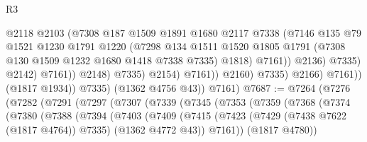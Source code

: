 \begin{lexlean}{R3}
\begin{coremodule}
                                          @2118
                                          @2103
                                          (@7308
                                            @187
                                            @1509
                                            @1891
                                            @1680
                                            @2117
                                            @7338
                                            (@7146
                                              @135
                                              @79
                                              @1521
                                              @1230
                                              @1791
                                              @1220
                                              (@7298
                                                @134
                                                @1511
                                                @1520
                                                @1805
                                                @1791
                                                (@7308 @130 @1509 @1232 @1680 @1418 @7338 @7335)
                                                @1818)
                                              @7161))
                                          @2136)
                                        @7335)
                                      @2142)
                                    @7161))
                                @2148)
                              @7335)
                            @2154)
                          @7161))
                      @2160)
                    @7335)
                  @2166)
                @7161))
            (@1817 @1934))
          @7335)
        (@1362 @4756 @43))
      @7161)
@7687 := @7264
    (@7276
      (@7282
        (@7291
          (@7297
            (@7307
              (@7339
                (@7345
                  (@7353
                    (@7359
                      (@7368
                        (@7374
                          (@7380
                            (@7388
                              (@7394
                                (@7403
                                  (@7409
                                    (@7415
                                      (@7423
                                        (@7429 (@7438 @7622 (@1817 @4764)) @7335)
                                        (@1362 @4772 @43))
                                      @7161))
                                  (@1817 @4780))

\end{coremodule}
\end{lexlean}

